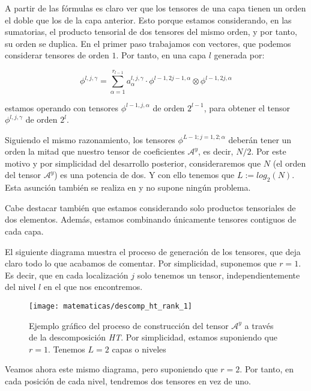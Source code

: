 A partir de las fórmulas es claro ver que los tensores de una capa tienen un orden el doble que los de la capa anterior. Esto porque estamos considerando, en las sumatorias, el producto tensorial de dos tensores del mismo orden, y por tanto, su orden se duplica. En el primer paso trabajamos con vectores, que podemos considerar tensores de orden $1$. Por tanto, en una capa $l$ generada por:

\begin{equation}
    \phi^{l, j, \gamma} = \sum_{\alpha = 1}^{r_{l-1}} a_{\alpha}^{l, j, \gamma} \cdot \phi^{l-1, 2j-1, \alpha} \otimes \phi^{l-1, 2j, \alpha}
\end{equation}

estamos operando con tensores $\phi^{l-1, j, \alpha}$ de orden $2^{l-1}$, para obtener el tensor $\phi^{l, j, \gamma}$ de orden $2^l$.

Siguiendo el mismo razonamiento, los tensores $\phi^{L-1; j = 1, 2; \alpha}$ deberán tener un orden la mitad que nuestro tensor de coeficientes $\mathcal{A}^y$, es decir, $N / 2$. Por este motivo y por simplicidad del desarrollo posterior, consideraremos que $N$ (el orden del tensor $\mathcal{A}^y$) es una potencia de dos. Y con ello tenemos que $L := log_2(N)$. Esta asunción también se realiza en \cite{matematicas:descomposicion_ht} y no supone ningún problema.

Cabe destacar también que estamos considerando solo productos tensoriales de dos elementos. Además, estamos combinando únicamente tensores contiguos de cada capa.

El siguiente diagrama muestra el proceso de generación de los tensores, que deja claro todo lo que acabamos de comentar. Por simplicidad, suponemos que $r = 1$. Es decir, que en cada localización $j$ solo tenemos un tensor, independientemente del nivel $l$ en el que nos encontremos.

\begin{figure}[H]
    \centering
    \texttt{[image: matematicas/descomp\_ht\_rank\_1]}
    \caption{Ejemplo gráfico del proceso de construcción del tensor $\mathcal{A}^y$ a través de la descomposición \textit{HT}. Por simplicidad, estamos suponiendo que $r = 1$. Tenemos $L = 2$ capas o niveles}
    \label{img:diagrama_ht_simple}
\end{figure}

Veamos ahora este mismo diagrama, pero suponiendo que $r = 2$. Por tanto, en cada posición de cada nivel, tendremos dos tensores en vez de uno.


